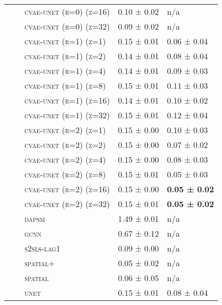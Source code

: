 \documentclass{article}
\begin{document}
\begin{table}[!tbp]
\begin{tabular}{lllll}
 &  & \textsc{cvae-unet (r=0) (z=16)} & 0.10 ± { 0.02} & n/a \\
 &  & \textsc{cvae-unet (r=0) (z=32)} & 0.09 ± { 0.02} & n/a \\
 &  & \textsc{cvae-unet (r=1) (z=1)} & 0.15 ± { 0.01} & 0.06 ± { 0.04} \\
 &  & \textsc{cvae-unet (r=1) (z=2)} & 0.14 ± { 0.01} & 0.08 ± { 0.04} \\
 &  & \textsc{cvae-unet (r=1) (z=4)} & 0.14 ± { 0.01} & 0.09 ± { 0.03} \\
 &  & \textsc{cvae-unet (r=1) (z=8)} & 0.15 ± { 0.01} & 0.11 ± { 0.03} \\
 &  & \textsc{cvae-unet (r=1) (z=16)} & 0.14 ± { 0.01} & 0.10 ± { 0.02} \\
 &  & \textsc{cvae-unet (r=1) (z=32)} & 0.15 ± { 0.01} & 0.12 ± { 0.04} \\
 &  & \textsc{cvae-unet (r=2) (z=1)} & 0.15 ± { 0.00} & 0.10 ± { 0.03} \\
 &  & \textsc{cvae-unet (r=2) (z=2)} & 0.15 ± { 0.00} & 0.07 ± { 0.02} \\
 &  & \textsc{cvae-unet (r=2) (z=4)} & 0.15 ± { 0.00} & 0.08 ± { 0.03} \\
 &  & \textsc{cvae-unet (r=2) (z=8)} & 0.15 ± { 0.01} & 0.05 ± { 0.03} \\
 &  & \textsc{cvae-unet (r=2) (z=16)} & 0.15 ± { 0.00} & \bf 0.05 ± { 0.02} \\
 &  & \textsc{cvae-unet (r=2) (z=32)} & 0.15 ± { 0.01} & \bf 0.05 ± { 0.02} \\
 &  & \textsc{dapsm} & 1.49 ± { 0.01} & n/a \\
 &  & \textsc{gcnn} & 0.67 ± { 0.12} & n/a \\
 &  & \textsc{s2sls-lag1} & 0.09 ± { 0.00} & n/a \\
 &  & \textsc{spatial+} & 0.05 ± { 0.02} & n/a \\
 &  & \textsc{spatial} & 0.06 ± { 0.05} & n/a \\
 &  & \textsc{unet} & 0.15 ± { 0.01} & 0.08 ± { 0.04} \\
\cline{1-5} \cline{2-5}
\bottomrule
\end{tabular}

\end{table}
\end{document}
